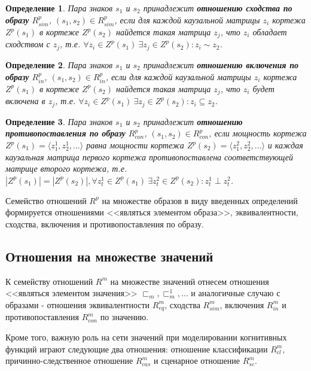 \documentclass[12pt]{scrartcl}
\newtheorem{definition}{Определение}
\begin{document}
	\begin{definition}\label{def:sim}
		Пара знаков  $s_1$ и $s_2$ принадлежит \textbf{отношению сходства по образу} $R_{sim}^p$, $(s_1,s_2)\in R_{sim}^p$, если для каждой каузальной матрицы $z_i$ кортежа $Z^p(s_1)$ в кортеже $Z^p(s_2)$ найдется такая матрица $z_j$, что $z_i$ обладает сходством с $z_j$, т.е. $\forall z_i\in Z^p(s_1)\ \exists z_j\in Z^p(s_2): z_i\sim z_2$.
	\end{definition}
	
	\begin{definition}
		Пара знаков  $s_1$ и $s_2$ принадлежит \textbf{отношению включения по образу} $R_{in}^p$, $(s_1,s_2)\in R_{in}^p$, если для каждой каузальной матрицы $z_i$ кортежа $Z^p(s_1)$ в кортеже $Z^p(s_2)$ найдется такая матрица $z_j$, что $z_i$ будет включена в $z_j$, т.е. $\forall z_i\in Z^p(s_1)\ \exists z_j\in Z^p(s_2): z_i\subseteq z_2$.
	\end{definition}

	\begin{definition}
		Пара знаков  $s_1$ и $s_2$ принадлежит \textbf{отношению противопоставления по образу} $R_{con}^p$, $(s_1,s_2)\in R_{con}^p$, если мощность кортежа $Z^p(s_1)=\langle z_1^1,z_2^1,\dots\rangle$ равна мощности кортежа $Z^p(s_2)=\langle z_1^2,z_2^2,\dots\rangle$ и каждая каузальная матрица первого кортежа противопоставлена соответствующей матрице второго кортежа, т.е. $|Z^p(s_1)| = |Z^p(s_2)|, \forall z_t^1\in Z^p(s_1)\ \exists z_t^2\in Z^p(s_2): z_t^1\perp z_t^2$.
	\end{definition}
	
	Семейство отношений $R^p$ на множестве образов в виду введенных определений формируется отношениями <<являться элементом образа>>, эквивалентности, сходства, включения и противопоставления по образу.
		
	\subsection{Отношения на множестве значений}	
	
	К семейству отношений $R^m$ на множестве значений отнесем отношения <<являться элементом значения>> ${\sqsubset_m,\sqsubset_m^1,\dots}$ и аналогичные случаю с образами - отношения эквивалентности $R_{eq}^m$, сходства $R_{sim}^m$, включения $R_{in}^m$ и противопоставления $R_{con}^m$ по значению.
	
	Кроме того, важную роль на сети значений при моделировании когнитивных функций играют следующие два отношения: отношение классификации $R_{cl}^m$, причинно-следственное отношение $R_{cas}^m$ и сценарное отношение $R_{sc}^m$.
\end{document}
